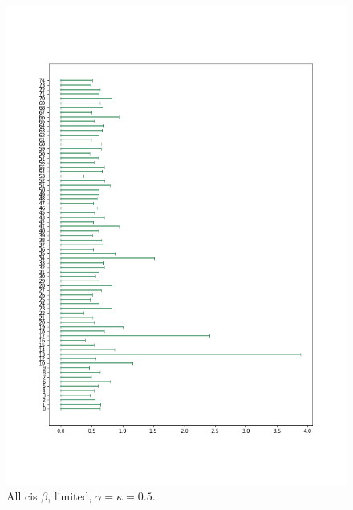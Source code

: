 \begin{figure}
    \centering
    \includegraphics[scale=0.48]{pictures/Gamma=kappa=0.5/all_cis_beta_lim.png}
    \caption{All cis $\beta$, limited, $\gamma=\kappa=0.5$.}
    \label{fig:all_cis_beta_lim_gk0.5}
\end{figure}

